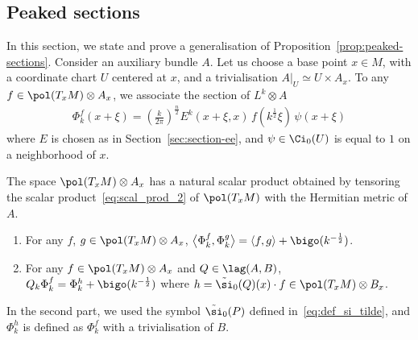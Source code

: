 \subsection{Peaked sections}
In this section, we state and prove a generalisation of Proposition~\ref{prop:peaked-sections}. Consider an auxiliary bundle $A$. Let us choose a base point $x \in M$, with a coordinate chart $U$ centered at $x$, and a trivialisation $A|_U \simeq U \times A_x$. To any $f \in \pol (T_xM) \otimes A_x$, we associate the section of $L^k \otimes A$
\begin{gather}\label{eq:phi_peaked_section_+}
\Phi_k^f (x+\xi) = \left(\frac{k}{2\pi} \right)^{\frac{n}{2}} E^k (x+ \xi, x) \, f\left(k^{\frac{1}{2}} \xi\right) \, \psi (x+ \xi)
\end{gather}
where $E$ is chosen as in Section~\ref{sec:section-ee}, and $\psi \in \Ci_0(U)$ is equal to $1$ on a neighborhood of $x$.

 The space $\pol (T_xM) \otimes A_x$ has a natural scalar product obtained by tensoring the scalar product~\eqref{eq:scal_prod_2} of $\pol (T_xM)$ with the Hermitian metric of $A$.

\begin{prop}\label{prop:peaked-sections_++}\leavevmode
\begin{enumerate}
\item\label{prop5.7.1} For any $f$, $g \in \pol (T_x M) \otimes A_x$, $\bigl\langle
\Phi_k^f, \Phi_k^g \bigr\rangle = \langle f, g \rangle + \bigo (k^{-\frac{1}{2}})$.
\item\label{prop5.7.2} For any $f \in \pol (T_x M) \otimes A_x$ and $Q \in \lag (A,B)$, $ Q_k \Phi_k^f = \Phi_k^h + \bigo (k^{-\frac{1}{2}})$ where $h = \tilde{\si}_0 (Q)(x) \cdot f \in \pol (T_xM) \otimes B_x$.
\end{enumerate}
\end{prop}

In the second part, we used the symbol $\tilde{\si}_0 (P)$ defined in~\eqref{eq:def_si_tilde}, and $\Phi_k^{h}$ is defined as $\Phi_k^f$ with a trivialisation of $B$.

